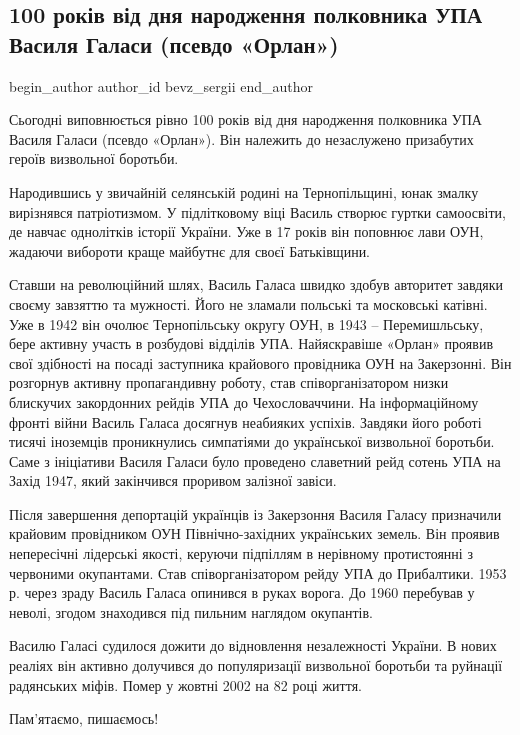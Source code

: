  
 
 
 
 
 
\subsection{100 років від дня народження полковника УПА Василя Галаси (псевдо «Орлан»)}
\label{sec:12_11_2020.fb.bevz_sergii.1.100_rokiv_upa_vasyl_galasa}
\ifcmt
	begin_author
   author_id bevz_sergii
	end_author
\fi
{}

Сьогодні виповнюється рівно 100 років від дня народження полковника УПА Василя
Галаси (псевдо «Орлан»). Він належить до незаслужено призабутих героїв
визвольної боротьби. 

Народившись у звичайній селянській родині на Тернопільщині, юнак змалку
вирізнявся патріотизмом. У підлітковому віці Василь створює гуртки самоосвіти,
де навчає однолітків історії України. Уже в 17 років він поповнює лави ОУН,
жадаючи вибороти краще майбутнє для своєї Батьківщини. 

Ставши на революційний шлях, Василь Галаса швидко здобув авторитет завдяки
своєму завзяттю та мужності. Його не зламали польські та московські катівні.
Уже в 1942 він очолює Тернопільську округу ОУН, в 1943 – Перемишльську, бере
активну участь в розбудові відділів УПА. Найяскравіше «Орлан» проявив свої
здібності на посаді заступника крайового провідника ОУН на Закерзонні. Він
розгорнув активну пропагандивну роботу, став співорганізатором низки блискучих
закордонних рейдів УПА до Чехословаччини. На інформаційному фронті війни Василь
Галаса досягнув неабияких успіхів. Завдяки його роботі тисячі іноземців
проникнулись симпатіями до української визвольної боротьби. Саме з  ініціативи
Василя Галаси було проведено славетний рейд сотень УПА на Захід 1947, який
закінчився проривом залізної завіси. 

Після завершення депортацій українців із Закерзоння Василя Галасу призначили
крайовим провідником ОУН Північно-західних українських земель. Він проявив
непересічні лідерські якості, керуючи підпіллям в нерівному протистоянні з
червоними окупантами. Став співорганізатором рейду УПА до Прибалтики. 1953 р.
через зраду Василь Галаса опинився в руках ворога. До 1960 перебував у неволі,
згодом знаходився під пильним наглядом окупантів.

Василю Галасі судилося дожити до відновлення незалежності України. В нових
реаліях він активно долучився до популяризації визвольної боротьби та руйнації
радянських міфів. Помер у жовтні 2002 на 82 році життя.

Пам’ятаємо, пишаємось!
